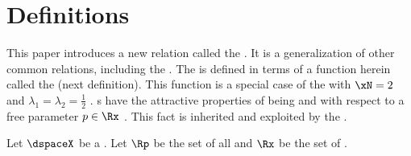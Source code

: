 \section{Definitions}
\label{sec:pdspace_def}
%

This paper introduces a new relation called the  .
It is a generalization of other common relations, including the  .
The  is defined in terms of a function herein called the  (next definition).
This function is a special case of the  with $\xN=2$ and $\lambda_1=\lambda_2=\frac{1}{2}$ .
s have the attractive properties of being  and  with respect
to a free parameter $p\in\Rx$ .
This fact is inherited and exploited by the  .
\begin{definition}
\label{def:ptf}
Let $\dspaceX$ be a  .
Let $\Rp$ be the set of all  
and $\Rx$ be the set of  .
\end{definition}

